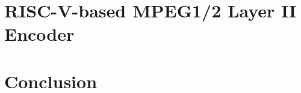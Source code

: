 \documentclass{esda}
\begin{document}
\cleardoublepage
\section{RISC-V-based MPEG1/2 Layer II Encoder}
\label{sec:curr}


%

\cleardoublepage
\section{Conclusion}
\label{sec:conc}


\cleardoublepage
{}

\end{document}
